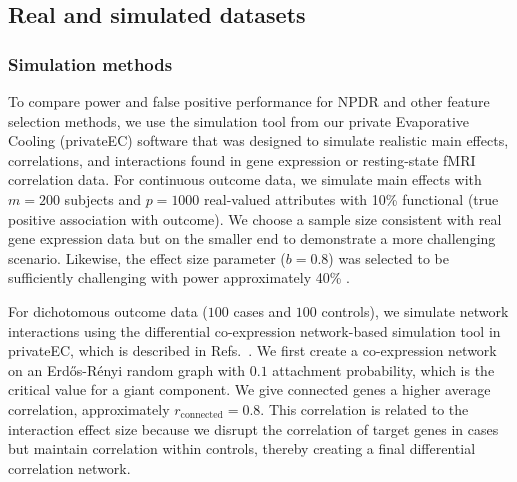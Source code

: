 \documentclass[10pt]{article}
\begin{document}
\subsection{Real and simulated datasets}
\subsubsection{Simulation methods}
To compare power and false positive performance for NPDR and other feature selection methods, we use the simulation tool from our private Evaporative Cooling (privateEC) software \cite{le17} that was designed to simulate realistic main effects, correlations, and interactions found in gene expression or resting-state fMRI correlation data.
For continuous outcome data, we simulate main effects with $m=200$ subjects and $p=1000$ real-valued attributes with 10\% functional (true positive association with outcome).
We choose a sample size consistent with real gene expression data but on the smaller end to demonstrate a more challenging scenario.
Likewise, the effect size parameter ($b=0.8$) was selected to be sufficiently challenging with power approximately 40\% \cite{le17}. 

For dichotomous outcome data ($100$ cases and $100$ controls), we simulate network interactions using the differential co-expression network-based simulation tool in privateEC, which is described in Refs.~\cite{le17, lareau15}. 
We first create a co-expression network on an Erd\H{o}s-R\'enyi random graph with $0.1$ attachment probability, which is the critical value for a giant component.
We give connected genes a higher average correlation, approximately $r_{\text{connected}}=0.8$. %
This correlation is related to the interaction effect size because we disrupt the correlation of target genes in cases but maintain correlation within controls, thereby creating a final differential correlation network.  
\end{document}
